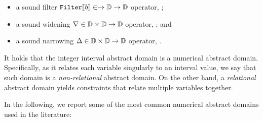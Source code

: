 \begin{definition}
\begin{itemize}
    \item a sound filter $\textup{\texttt{Filter}}\llbracket b \rrbracket\in\to\mathbb{D}\to\mathbb{D}$ operator, \cf{} ;
    \item a sound widening $\nabla\in\mathbb{D}\times\mathbb{D}\to\mathbb{D}$ operator, \cf{} ; and
    \item a sound narrowing $\Delta\in\mathbb{D}\times\mathbb{D}\to\mathbb{D}$ operator, \cf{} .
  \end{itemize}
\end{definition}

\begin{remark}
  It holds that the integer interval abstract domain is a numerical abstract domain.
  Specifically, as it relates each variable singularly to an interval value, we say that such domain is a \emph{non-relational} abstract domain.
  On the other hand, a \emph{relational} abstract domain yields constraints that relate multiple variables together.
\end{remark}


In the following, we report some of the most common numerical abstract domains used in the literature:

